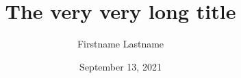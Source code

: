 \documentclass{beamer}
\title[Short title]{The very very long title}
\author[Firstname Lastname]{Firstname Lastname}
\institute[UWyo]{University of Wyoming}
\date{September 13, 2021}
\begin{document}
\begin{frame}
\maketitle
\end{frame}


\end{document}
